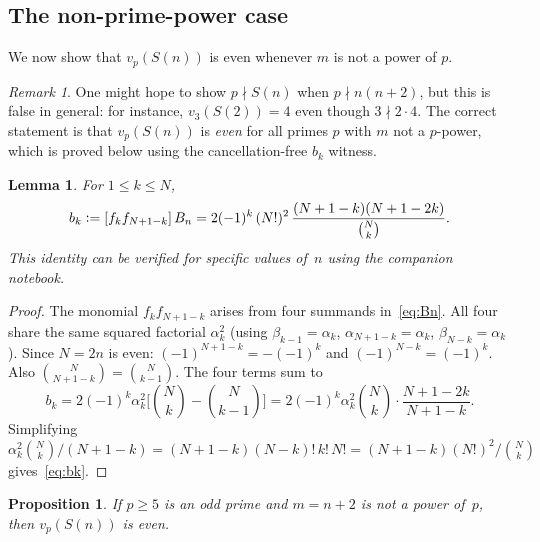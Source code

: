 \documentclass[10pt]{amsart}
\newtheorem{proposition}[theorem]{Proposition}
\newtheorem{lemma}[theorem]{Lemma}
\theoremstyle{definition}
\theoremstyle{remark}
\newtheorem*{remark}{Remark}
\newcommand{\defeq}{\vcentcolon=}
\begin{document}
\subsection{The non-prime-power case}\label{subsec:nonpp}

We now show that $v_p(S(n))$ is even whenever $m$ is not a power of $p$.

\begin{remark}\label{rem:no-caseA}
One might hope to show $p \nmid S(n)$ when $p \nmid n(n+2)$, but this
is false in general: for instance, $v_3(S(2)) = 4$ even though
$3 \nmid 2 \cdot 4$.  The correct statement is that $v_p(S(n))$ is
\emph{even} for all primes $p$ with $m$ not a $p$-power, which is
proved below using the cancellation-free $b_k$ witness.
\end{remark}

\begin{lemma}\label{lem:bk}
For $1 \le k \le N$,
\begin{equation}\label{eq:bk}
b_k \defeq [f_k f_{N+1-k}]\,B_n = 2(-1)^k\,(N!)^2\,
\frac{(N+1-k)(N+1-2k)}{\binom{N}{k}}.
\end{equation}
This identity can be verified for specific values of~$n$ using the
companion notebook.
\end{lemma}

\begin{proof}
The monomial $f_k f_{N+1-k}$ arises from four summands in~\eqref{eq:Bn}.
All four share the same squared factorial $\alpha_k^2$ (using
$\beta_{k-1} = \alpha_k$, $\alpha_{N+1-k} = \alpha_k$,
$\beta_{N-k} = \alpha_k$).  Since $N = 2n$ is even:
$(-1)^{N+1-k} = -(-1)^k$ and $(-1)^{N-k} = (-1)^k$.
Also $\binom{N}{N+1-k} = \binom{N}{k-1}$.
The four terms sum to
\[
b_k = 2(-1)^k \alpha_k^2\bigl[\binom{N}{k}-\binom{N}{k-1}\bigr]
    = 2(-1)^k \alpha_k^2 \binom{N}{k} \cdot \frac{N+1-2k}{N+1-k}.
\]
Simplifying $\alpha_k^2 \binom{N}{k}/(N+1-k) = (N+1-k)(N-k)!\,k!\,N!
= (N+1-k)(N!)^2/\binom{N}{k}$ gives~\eqref{eq:bk}.
\end{proof}

\begin{proposition}\label{prop:nonpp}
If $p \ge 5$ is an odd prime and $m = n+2$ is not a power of~$p$, then
$v_p(S(n))$ is even.
\end{proposition}
\end{document}
